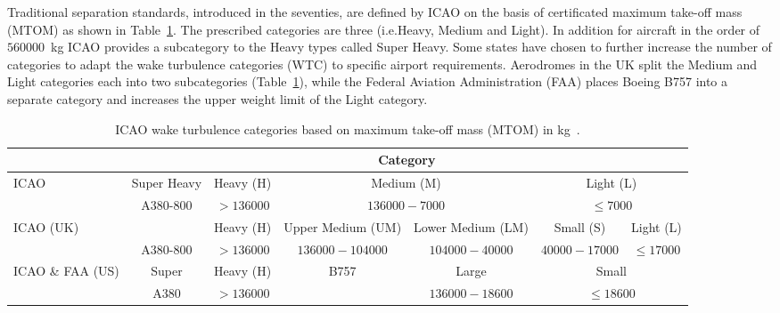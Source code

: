 Traditional separation standards, introduced in the seventies, are defined by ICAO  on the basis of certificated maximum take-off mass (MTOM) as shown in Table~\ref{tab:WTC}. The prescribed categories are three (i.e.Heavy, Medium and Light). In addition for aircraft in the order of $560000$~kg ICAO provides a subcategory to the Heavy types called Super Heavy. Some states have chosen to further increase the number of categories to adapt the wake turbulence categories (WTC) to specific airport requirements. Aerodromes in the UK split the Medium and Light categories each into two subcategories (Table~\ref{tab:WTC}), while the Federal Aviation Administration (FAA) places Boeing B757 into a separate category and increases the upper weight limit of the Light category.~\cite{icao_wtc, uk_aeronautical_information_services_wake_2017, noauthor_recat_2018}

\begin{table}[h]
    \centering
    \resizebox{1\textwidth}{!} {
    \begin{tabular}{l|c|c|c|c|c|c}
    ~    & \multicolumn{6}{c}{Category} \\ \hline
    ICAO & Super Heavy & Heavy (H) & \multicolumn{2}{c|}{Medium (M)} & \multicolumn{2}{c}{Light (L)} \\
    
    ~    & A380-800    & $ > 136000 $  & \multicolumn{2}{c|}{$ 136000-7000 $ } & \multicolumn{2}{c}{$ \leq 7000 $} \\ \hline
    
    ICAO (UK)   & ~  & Heavy (H) & Upper Medium (UM) & Lower Medium (LM) & Small (S)  & Light (L) \\
    
    ~    & A380-800    & $ > 136000 $  & $ 136000-104000 $     & $ 104000-40000 $      & $ 40000-17000 $ & $ \leq 17000 $   \\ \hline
    
    ICAO \& FAA (US)   & Super      & Heavy (H) & B757   & Large   & \multicolumn{2}{c}{Small} \\
    
    ~    & A380        & $ > 136000 $  & ~                 & $ 136000-18600 $      & \multicolumn{2}{c}{$ \leq 18600 $} \\ 
    \end{tabular}}
    \caption[ICAO wake turbulence categories based on maximum take-off mass]{ICAO wake turbulence categories based on maximum take-off mass (MTOM) in kg~\cite{icao_wtc, uk_aeronautical_information_services_wake_2017, kolos2013influence}.} \label{tab:WTC}
\end{table}

